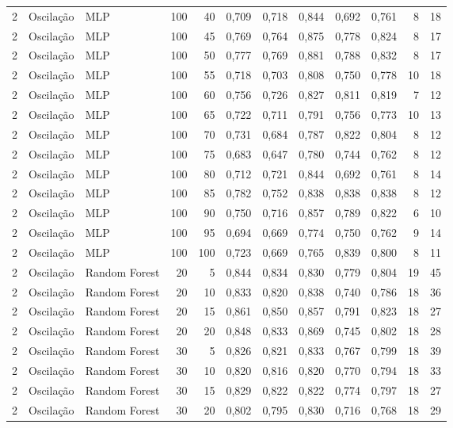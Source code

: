 \begin{longtable}{@{}rllrrrrrrrrr@{}}
2 & Oscilação & MLP & 100 & 40 & 0,709 & 0,718 & 0,844 & 0,692 & 0,761 & 8 & 18 \\
2 & Oscilação & MLP & 100 & 45 & 0,769 & 0,764 & 0,875 & 0,778 & 0,824 & 8 & 17 \\
2 & Oscilação & MLP & 100 & 50 & 0,777 & 0,769 & 0,881 & 0,788 & 0,832 & 8 & 17 \\
2 & Oscilação & MLP & 100 & 55 & 0,718 & 0,703 & 0,808 & 0,750 & 0,778 & 10 & 18 \\
2 & Oscilação & MLP & 100 & 60 & 0,756 & 0,726 & 0,827 & 0,811 & 0,819 & 7 & 12 \\
2 & Oscilação & MLP & 100 & 65 & 0,722 & 0,711 & 0,791 & 0,756 & 0,773 & 10 & 13 \\
2 & Oscilação & MLP & 100 & 70 & 0,731 & 0,684 & 0,787 & 0,822 & 0,804 & 8 & 12 \\
2 & Oscilação & MLP & 100 & 75 & 0,683 & 0,647 & 0,780 & 0,744 & 0,762 & 8 & 12 \\
2 & Oscilação & MLP & 100 & 80 & 0,712 & 0,721 & 0,844 & 0,692 & 0,761 & 8 & 14 \\
2 & Oscilação & MLP & 100 & 85 & 0,782 & 0,752 & 0,838 & 0,838 & 0,838 & 8 & 12 \\
2 & Oscilação & MLP & 100 & 90 & 0,750 & 0,716 & 0,857 & 0,789 & 0,822 & 6 & 10 \\
2 & Oscilação & MLP & 100 & 95 & 0,694 & 0,669 & 0,774 & 0,750 & 0,762 & 9 & 14 \\
2 & Oscilação & MLP & 100 & 100 & 0,723 & 0,669 & 0,765 & 0,839 & 0,800 & 8 & 11 \\
2 & Oscilação & Random Forest & 20 & 5 & 0,844 & 0,834 & 0,830 & 0,779 & 0,804 & 19 & 45 \\
2 & Oscilação & Random Forest & 20 & 10 & 0,833 & 0,820 & 0,838 & 0,740 & 0,786 & 18 & 36 \\
2 & Oscilação & Random Forest & 20 & 15 & 0,861 & 0,850 & 0,857 & 0,791 & 0,823 & 18 & 27 \\
2 & Oscilação & Random Forest & 20 & 20 & 0,848 & 0,833 & 0,869 & 0,745 & 0,802 & 18 & 28 \\
2 & Oscilação & Random Forest & 30 & 5 & 0,826 & 0,821 & 0,833 & 0,767 & 0,799 & 18 & 39 \\
2 & Oscilação & Random Forest & 30 & 10 & 0,820 & 0,816 & 0,820 & 0,770 & 0,794 & 18 & 33 \\
2 & Oscilação & Random Forest & 30 & 15 & 0,829 & 0,822 & 0,822 & 0,774 & 0,797 & 18 & 27 \\
2 & Oscilação & Random Forest & 30 & 20 & 0,802 & 0,795 & 0,830 & 0,716 & 0,768 & 18 & 29 \\

\end{longtable}
